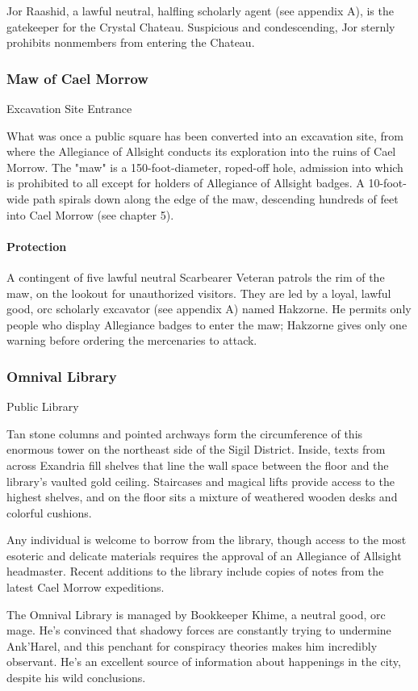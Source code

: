 \documentclass[10pt,a4paper,twoside,bg=print,twocolumn,openany,nodeprecatedcode]{dndbook}
\begin{document}
Jor Raashid, a lawful neutral, halfling scholarly agent (see appendix A), is the gatekeeper for the Crystal Chateau. Suspicious and condescending, Jor sternly prohibits nonmembers from entering the Chateau.

\subsubsection{Maw of Cael Morrow}
Excavation Site Entrance

What was once a public square has been converted into an excavation site, from where the Allegiance of Allsight conducts its exploration into the ruins of Cael Morrow. The "maw" is a 150-foot-diameter, roped-off hole, admission into which is prohibited to all except for holders of Allegiance of Allsight badges. A 10-foot-wide path spirals down along the edge of the maw, descending hundreds of feet into Cael Morrow (see chapter 5).

\paragraph{Protection}
A contingent of five lawful neutral Scarbearer Veteran patrols the rim of the maw, on the lookout for unauthorized visitors. They are led by a loyal, lawful good, orc scholarly excavator (see appendix A) named Hakzorne. He permits only people who display Allegiance badges to enter the maw; Hakzorne gives only one warning before ordering the mercenaries to attack.

\subsubsection{Omnival Library}
Public Library

Tan stone columns and pointed archways form the circumference of this enormous tower on the northeast side of the Sigil District. Inside, texts from across Exandria fill shelves that line the wall space between the floor and the library's vaulted gold ceiling. Staircases and magical lifts provide access to the highest shelves, and on the floor sits a mixture of weathered wooden desks and colorful cushions.

Any individual is welcome to borrow from the library, though access to the most esoteric and delicate materials requires the approval of an Allegiance of Allsight headmaster. Recent additions to the library include copies of notes from the latest Cael Morrow expeditions.

The Omnival Library is managed by Bookkeeper Khime, a neutral good, orc mage. He's convinced that shadowy forces are constantly trying to undermine Ank'Harel, and this penchant for conspiracy theories makes him incredibly observant. He's an excellent source of information about happenings in the city, despite his wild conclusions.
\end{document}
